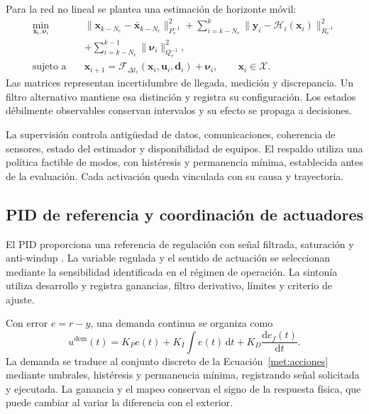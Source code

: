 Para la red no lineal se plantea una estimación de horizonte móvil:
\begin{equation}
\begin{split}
\min_{\mathbf x_i,\boldsymbol\nu_i}\quad&
\|\mathbf x_{k-N_e}-\bar{\mathbf x}_{k-N_e}\|_{P_e^{-1}}^2
+\sum_{i=k-N_e}^{k}\|\mathbf y_i-\mathcal H_i(\mathbf x_i)\|_{R_e^{-1}}^2\\
&+\sum_{i=k-N_e}^{k-1}\|\boldsymbol\nu_i\|_{Q_e^{-1}}^2,\\
\text{sujeto a}\quad&\mathbf x_{i+1}=\mathcal F_{\Delta t_c}
(\mathbf x_i,\mathbf u_i,\mathbf d_i)+\boldsymbol\nu_i,\qquad\mathbf x_i\in\mathcal X.
\end{split}
\label{met:mhe}
\end{equation}
Las matrices representan incertidumbre de llegada, medición y discrepancia. Un filtro alternativo mantiene esa distinción y registra su configuración. Los estados débilmente observables conservan intervalos y su efecto se propaga a decisiones.

La supervisión controla antigüedad de datos, comunicaciones, coherencia de sensores, estado del estimador y disponibilidad de equipos. El respaldo utiliza una política factible de modos, con histéresis y permanencia mínima, establecida antes de la evaluación. Cada activación queda vinculada con su causa y trayectoria.

\subsection{PID de referencia y coordinación de actuadores}
\label{met:pid}

El PID proporciona una referencia de regulación con señal filtrada, saturación y anti-windup \cite{astrom2008}. La variable regulada y el sentido de actuación se seleccionan mediante la sensibilidad identificada en el régimen de operación. La sintonía utiliza desarrollo y registra ganancias, filtro derivativo, límites y criterio de ajuste.

Con error $e=r-y$, una demanda continua se organiza como
\begin{equation}
u^{\mathrm{dem}}(t)=K_Pe(t)+K_I\int e(t)\,\mathrm dt
+K_D\frac{\mathrm d e_f(t)}{\mathrm dt}.
\label{met:pid_demanda}
\end{equation}
La demanda se traduce al conjunto discreto de la Ecuación~\ref{met:acciones} mediante umbrales, histéresis y permanencia mínima, registrando señal solicitada y ejecutada. La ganancia y el mapeo conservan el signo de la respuesta física, que puede cambiar al variar la diferencia con el exterior.

